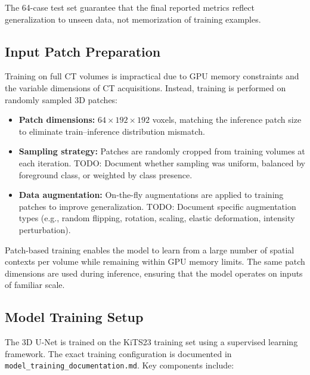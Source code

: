 
The 64-case test set guarantee that the final reported metrics reflect generalization to unseen data, not memorization of training examples.

\subsection{Input Patch Preparation}

Training on full CT volumes is impractical due to GPU memory constraints and the variable dimensions of CT acquisitions. Instead, training is performed on randomly sampled 3D patches:

\begin{itemize}
    \item \textbf{Patch dimensions:} $64 \times 192 \times 192$ voxels, matching the inference patch size to eliminate train--inference distribution mismatch.
    \item \textbf{Sampling strategy:} Patches are randomly cropped from training volumes at each iteration. TODO: Document whether sampling was uniform, balanced by foreground class, or weighted by class presence.
    \item \textbf{Data augmentation:} On-the-fly augmentations are applied to training patches to improve generalization. TODO: Document specific augmentation types (e.g., random flipping, rotation, scaling, elastic deformation, intensity perturbation).
\end{itemize}

Patch-based training enables the model to learn from a large number of spatial contexts per volume while remaining within GPU memory limits. The same patch dimensions are used during inference, ensuring that the model operates on inputs of familiar scale.

\subsection{Model Training Setup}

The 3D U-Net \cite{unet3d} is trained on the KiTS23 training set using a supervised learning framework. The exact training configuration is documented in \texttt{model\_training\_documentation.md}. Key components include:

